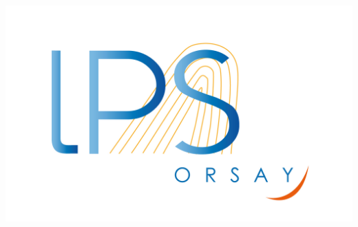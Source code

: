\begin{frame}
\begin{columns}
\begin{column}{2cm}
~\\
~\\
~\\
~\\
\raggedleft
\includegraphics[scale=.15]{img/0_cover/logo-lps.jpg}
\end{column}
\end{columns}
\end{frame}
